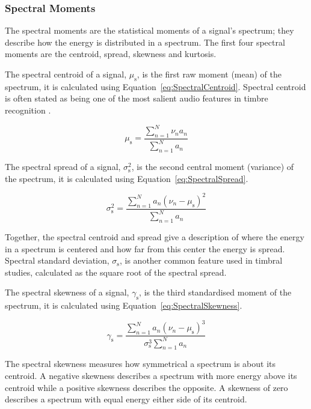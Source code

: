 		\subsubsection*{Spectral Moments}
			The spectral moments are the statistical moments of a signal's spectrum; they describe how the
			energy is distributed in a spectrum. The first four spectral moments are the centroid, spread,
			skewness and kurtosis.

			The spectral centroid of a signal, $\mu_{\mathrm{s}}$, is the first raw moment (mean) of the
			spectrum, it is calculated using Equation~\ref{eq:SpectralCentroid}. Spectral centroid is often
			stated as being one of the most salient audio features in timbre recognition
			\citep{freed1990auditory, lakatos2000a}. 

			\begin{equation}
				\mu_{\mathrm{s}} = \frac{\sum_{n = 1}^{N} \nu_{n}a_{n}}
					   	   {\sum_{n = 1}^{N} a_{n}}
				\label{eq:SpectralCentroid}
			\end{equation}

			The spectral spread of a signal, $\sigma_{\mathrm{s}}^{2}$, is the second central moment (variance)
			of the spectrum, it is calculated using Equation~\ref{eq:SpectralSpread}.

			\begin{equation}
				\sigma_{\mathrm{s}}^{2} = \frac{\sum_{n = 1}^{N} a_{n}(\nu_{n} - \mu_{\mathrm{s}})^{2}}
						  	  {\sum_{n = 1}^{N} a_{n}}
				\label{eq:SpectralSpread}
			\end{equation}

			Together, the spectral centroid and spread give a description of where the energy in a spectrum is
			centered and how far from this center the energy is spread. Spectral standard deviation,
			$\sigma_{\mathrm{s}}$, is another common feature used in timbral studies, calculated as the square
			root of the spectral spread.

			The spectral skewness of a signal, $\gamma_{\mathrm{s}}$, is the third standardised moment of the
			spectrum, it is calculated using Equation~\ref{eq:SpectralSkewness}.

			\begin{equation}
				\gamma_{\mathrm{s}} = \frac{\sum_{n = 1}^{N} a_{n}(\nu_{n} - \mu_{\mathrm{s}})^{3}}
					{\sigma_{\mathrm{s}}^{3}\sum_{n = 1}^{N} a_{n}}
				\label{eq:SpectralSkewness}
			\end{equation}

			The spectral skewness measures how symmetrical a spectrum is about its centroid. A negative
			skewness describes a spectrum with more energy above its centroid while a positive skewness
			describes the opposite. A skewness of zero describes a spectrum with equal energy either side of
			its centroid.

